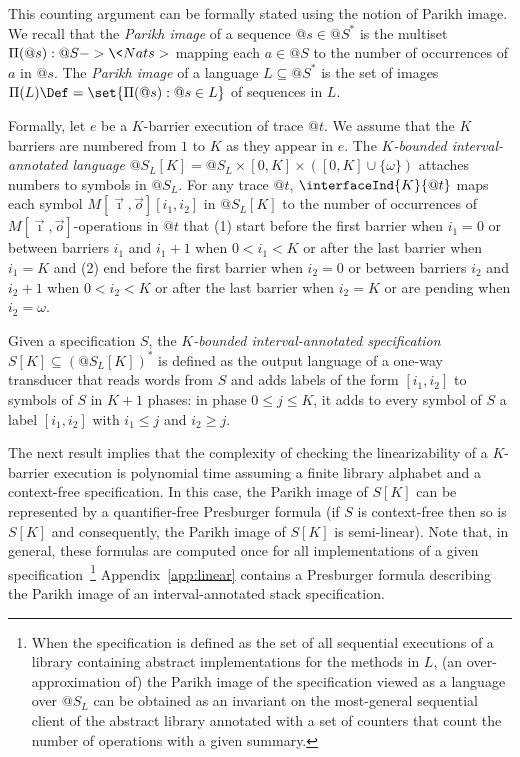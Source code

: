 This counting argument can be formally stated using the notion of Parikh image. We recall that the \emph{Parikh image} of a sequence $@s \in
@S^\ast$ is the multiset $\Pi(@s) : @S -> \<Nats>$ mapping each $a \in
@S$ to the number of occurrences of $a$ in $@s$. The \emph{Parikh image} of a
language $L \subseteq @S^\ast$ is the set of images $\Pi(L) \Def= \set{ \Pi(@s) : @s
\in L }$ of sequences in $L$.


Formally, let $e$ be a $K$-barrier execution of trace $@t$. We assume that the $K$ barriers are 
numbered from $1$ to $K$ as they appear in $e$. The 
\emph{$K$-bounded interval-annotated language}
$@S_L[K]=@S_L\times[0,K]\times ([0,K]\cup\{\omega\})$ attaches numbers to symbols in $@S_L$. For any trace $@t$, $\interfaceInd{K}{@t}$ maps each symbol $M[\vec{\imath},\vec{o}][i_1,i_2]$ in $@S_L[K]$ to the number of 
occurrences of $M[\vec{\imath},\vec{o}]$-operations in $@t$ that (1) start before the first barrier when $i_1=0$ or 
between barriers $i_1$ and $i_1+1$ when $0<i_1<K$ or 
after the last barrier when $i_1=K$ and (2) end before the first barrier when $i_2=0$ or between barriers $i_2$ and $i_2+1$ when $0<i_2<K$ or after the last barrier when $i_2=K$ or are pending when $i_2=\omega$.

Given a specification $S$, the \emph{$K$-bounded interval-annotated specification} $S[K]\subseteq (@S_L[K])^*$ is defined as the output language of a one-way transducer that reads words from $S$ and adds labels of the form $[i_1,i_2]$ to symbols of $S$ in $K+1$ phases: in phase $0\leq j\leq K$, it adds to every symbol of $S$ a label  $[i_1,i_2]$ with $i_1\leq j$ and $i_2\geq j$.

The next result implies that the complexity of checking the linearizability of a $K$-barrier execution is polynomial time 
assuming a  finite library alphabet and a context-free specification. 
In this case, the Parikh image of $S[K]$ can be represented by a 
quantifier-free Presburger formula (if $S$ is context-free then so is $S[K]$ and consequently, the Parikh image of $S[K]$ is semi-linear). 
Note that, in general, these formulas are computed once for all implementations of a given specification~\footnote{When the specification is defined as the set of all sequential executions of a library containing abstract implementations for the methods in $L$, (an over-approximation of) the Parikh image of the specification viewed as a language over $@S_L$ can be obtained as an invariant on the most-general sequential client of the abstract library annotated with a set of counters that count the number of operations with a given summary.} Appendix~\ref{app:linear} contains a Presburger formula describing the Parikh image of an  interval-annotated stack specification.

